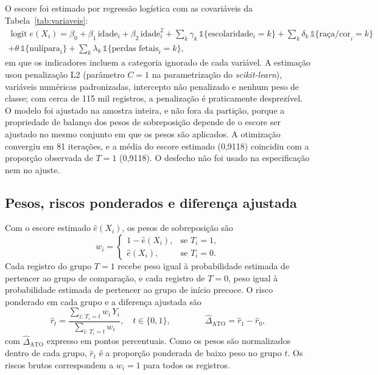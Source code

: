 \documentclass[11pt,a4paper]{article}
\newcommand{\ATO}{\mathrm{ATO}}
\begin{document}
O escore foi estimado por regressão logística com as covariáveis da
Tabela~\ref{tab:variaveis}:
\begin{multline}\label{eq:logit}
\operatorname{logit} e(X_i) = \beta_0 + \beta_1\,\text{idade}_i + \beta_2\,\text{idade}_i^2
 + \sum_{k} \gamma_k\,\mathbb{1}\{\text{escolaridade}_i = k\}
 + \sum_{k} \delta_k\,\mathbb{1}\{\text{raça/cor}_i = k\} \\
 + \theta\,\mathbb{1}\{\text{nulípara}_i\}
 + \sum_{k} \lambda_k\,\mathbb{1}\{\text{perdas fetais}_i = k\},
\end{multline}
em que os indicadores incluem a categoria ignorado de cada variável. A estimação usou
penalização L2 (parâmetro $C = 1$ na parametrização do \emph{scikit-learn}), variáveis
numéricas padronizadas, intercepto não penalizado e nenhum peso de classe; com cerca de
115 mil registros, a penalização é praticamente desprezível. O modelo foi ajustado na
amostra inteira, e não fora da partição, porque a propriedade de balanço dos pesos de
sobreposição depende de o escore ser ajustado no mesmo conjunto em que os pesos são
aplicados. A otimização convergiu em 81 iterações, e a média do escore estimado (0,9118)
coincidiu com a proporção observada de $T=1$ (0,9118). O desfecho não foi usado na
especificação nem no ajuste.

\subsection{Pesos, riscos ponderados e diferença ajustada}

Com o escore estimado $\hat{e}(X_i)$, os pesos de sobreposição são
\begin{equation}\label{eq:pesos}
w_i =
\begin{cases}
1 - \hat{e}(X_i), & \text{se } T_i = 1,\\[2pt]
\hat{e}(X_i), & \text{se } T_i = 0.
\end{cases}
\end{equation}
Cada registro do grupo $T=1$ recebe peso igual à probabilidade estimada de pertencer ao
grupo de comparação, e cada registro de $T=0$, peso igual à probabilidade estimada de
pertencer ao grupo de início precoce. O risco ponderado em cada grupo e a diferença
ajustada são
\begin{equation}\label{eq:risco}
\hat{r}_t = \frac{\sum_{i:\,T_i = t} w_i\,Y_i}{\sum_{i:\,T_i = t} w_i},
\quad t \in \{0, 1\},
\qquad\qquad
\hat{\Delta}_{\ATO} = \hat{r}_1 - \hat{r}_0 ,
\end{equation}
com $\hat{\Delta}_{\ATO}$ expresso em pontos percentuais. Como os pesos são normalizados
dentro de cada grupo, $\hat{r}_t$ é a proporção ponderada de baixo peso no grupo $t$. Os
riscos brutos correspondem a $w_i = 1$ para todos os registros.
\end{document}
